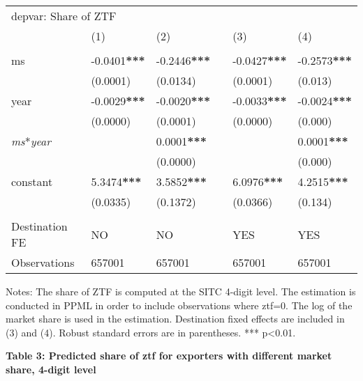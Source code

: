 \documentclass[12pt,twoside,a4paper,notitlepage]{article}
\begin{document}
\begin{table}
\begin{tabularx}{\textwidth}{
p{}
p{}
p{}
p{}
p{}
p{}
p{}}
\multicolumn{7}{l}{ depvar: Share of ZTF} \\
 & (1) & (2) & & (3) & \multicolumn{2}{l}{(4)} \\
 & & & & & \multicolumn{2}{l}{} \\
ms & -0.0401\textbf{***} & -0.2446\textbf{***} & & -0.0427\textbf{***} & \multicolumn{2}{l}{-0.2573\textbf{***}} \\
 & (0.0001) & (0.0134) & & (0.0001) & \multicolumn{2}{l}{(0.013)} \\
year & -0.0029\textbf{***} & -0.0020\textbf{***} & & -0.0033\textbf{***} & \multicolumn{2}{l}{-0.0024\textbf{***}} \\
 & (0.0000) & (0.0001) & & (0.0000) & \multicolumn{2}{l}{(0.000)} \\
\textit{ms}*\textit{year} & & 0.0001\textbf{***} & & & \multicolumn{2}{l}{0.0001\textbf{***}} \\
 & & (0.0000) & & & \multicolumn{2}{l}{(0.000)} \\
constant & 5.3474\textbf{***} & 3.5852\textbf{***} & & 6.0976\textbf{***} & \multicolumn{2}{l}{4.2515\textbf{***}} \\
 & (0.0335) & (0.1372) & & (0.0366) & \multicolumn{2}{l}{(0.134)} \\
 & & & & \multicolumn{3}{l}{} \\
Destination FE & NO & NO & & YES & \multicolumn{2}{l}{YES} \\
Observations & 657001 & 657001 & & 657001 & \multicolumn{2}{l}{657001} \\

\end{tabularx}

\end{table}

Notes: The share of ZTF is computed at the SITC 4-digit level. The estimation is conducted in PPML in order to include observations where ztf=0. The log of the market share is used in the estimation. Destination fixed effects are included in (3) and (4). Robust standard errors are in parentheses. *** p{\textless}0.01.

 

\textbf{Table 3: Predicted share of ztf for exporters with different market share, 4-digit level \label{ref-006}}
\end{document}
